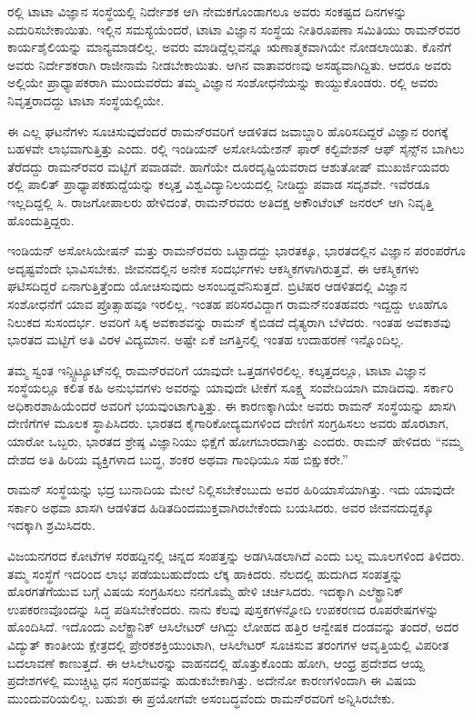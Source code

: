 ರಲ್ಲಿ ಟಾಟಾ ವಿಜ್ಞಾನ ಸಂಸ್ಥೆಯಲ್ಲಿ ನಿರ್ದೇಶಕ ಆಗಿ ನೇಮಕಗೊಂಡಾಗಲೂ ಅವರು ಸಂಕಷ್ಟದ ದಿನಗಳನ್ನು ಎದುರಿಸಬೇಕಾಯಿತು. ಇಲ್ಲಿನ ಸಮಸ್ಯೆಯೆಂದರೆ, ಟಾಟಾ ವಿಜ್ಞಾನ ಸಂಸ್ಥೆಯ ನೀತಿರೂಪಣಾ ಸಮಿತಿಯು ರಾಮನ್‍ರವರ ಕಾರ್ಯಶೈಲಿಯನ್ನು ಮಾನ್ಯಮಾಡಲಿಲ್ಲ. ಅವರು ಮಾಡಿದ್ದೆಲ್ಲವನ್ನೂ ಋಣಾತ್ಮಕವಾಗಿಯೇ ನೋಡಲಾಯಿತು. ಕೊನೆಗೆ ಅವರು ನಿರ್ದೇಶಕರಾಗಿ ರಾಜೀನಾಮೆ ನೀಡಬೇಕಾಯಿತು. ಆಗಿನ ವಾತಾವರಣವು ಅಸಹ್ಯವಾಗಿದ್ದಿತು. ಆದರೂ ಅವರು ಅಲ್ಲಿಯೇ ಪ್ರಾಧ್ಯಾಪಕರಾಗಿ ಮುಂದುವರೆದು ತಮ್ಮ ವಿಜ್ಞಾನ ಸಂಶೋಧನೆಯನ್ನು ಕಾಯ್ದುಕೊಂಡರು. ರಲ್ಲಿ ಅವರು ನಿವೃತ್ತರಾದದ್ದು ಟಾಟಾ ಸಂಸ್ಥೆಯಲ್ಲಿಯೇ.

ಈ ಎಲ್ಲ ಘಟನೆಗಳು ಸೂಚಿಸುವುದೆಂದರೆ ರಾಮನ್‍ರವರಿಗೆ ಆಡಳಿತದ ಜವಾಬ್ದಾರಿ ಹೊರಿಸದಿದ್ದರೆ ವಿಜ್ಞಾನ ರಂಗಕ್ಕೆ ಬಹಳವೇ ಲಾಭವಾಗುತ್ತಿತ್ತು ಎಂದು. ರಲ್ಲಿ ಇಂಡಿಯನ್ ಅಸೋಸಿಯೇಶನ್ ಫಾರ್ ಕಲ್ಟಿವೇಶನ್ ಆಫ್ ಸೈನ್ಸ್‌ನ ಬಾಗಿಲು ತೆರೆದದ್ದು ರಾಮನ್‍ರವರ ಮಟ್ಟಿಗೆ ಪವಾಡವೇ. ಹಾಗೆಯೇ ದೂರದೃಷ್ಟಿಯವರಾದ ಆಶುತೋಷ್ ಮುಖರ್ಜಿಯವರು ರಲ್ಲಿ ಪಾಲಿತ್ ಪ್ರಾಧ್ಯಾಪಕ\break ಹುದ್ದೆಯನ್ನು ಕಲ್ಕತ್ತ ವಿಶ್ವವಿದ್ಯಾನಿಲಯದಲ್ಲಿ ನೀಡಿದ್ದು ಪವಾಡ ಸದೃಶವೇ. ಇವೆರಡೂ ಇಲ್ಲದಿದ್ದಲ್ಲಿ ಸಿ. ರಾಜಗೋಪಾಲರು ಹೇಳಿದಂತೆ, ರಾಮನ್‍ರವರು ಅತಿದಕ್ಷ ಅಕೌಂಟೆಂಟ್ ಜನರಲ್ ಆಗಿ ನಿವೃತ್ತಿ ಹೊಂದುತ್ತಿದ್ದರು.

ಇಂಡಿಯನ್ ಅಸೋಸಿಯೇಷನ್ ಮತ್ತು ರಾಮನ್‍ರವರು ಒಟ್ಟಾದದ್ದು ಭಾರತಕ್ಕೂ, ಭಾರತದಲ್ಲಿನ ವಿಜ್ಞಾನ ಪರಂಪರೆಗೂ ಅದೃಷ್ಟವೆಂದೇ ಭಾವಿಸಬೇಕು. ಜೀವನದಲ್ಲಿನ ಅನೇಕ ಸಂದರ್ಭಗಳು ಆಕಸ್ಮಿಕಗಳಾಗಿರುತ್ತವೆ. ಈ ಆಕಸ್ಮಿಕಗಳು ಘಟಿಸದಿದ್ದರೆ ಏನಾಗುತ್ತಿತ್ತೆಂದು ಯೋಚಿಸುವುದು ಅಸಂಬದ್ದ\-ವೆನಿಸುತ್ತದೆ. ಬ್ರಿಟಿಷರ ಆಡಳಿತದಲ್ಲಿ ವಿಜ್ಞಾನ ಸಂಶೋಧನೆಗೆ ಯಾವ ಪ್ರೊತ್ಸಾಹವೂ ಇರಲಿಲ್ಲ. ಇಂತಹ ಪರಿಸರವಿದ್ದಾಗ ರಾಮನ್‌ನಂತಹವರು ಇದ್ದದ್ದು ಊಹೆಗೂ ನಿಲುಕದ ಸುಸಂದರ್ಭ. ಅವರಿಗೆ ಸಿಕ್ಕ ಅವಕಾಶವನ್ನು ರಾಮನ್ ಕೈಬಿಡದೆ ದೈತ್ಯರಾಗಿ ಬೆಳೆದರು. ಇಂತಹ ಅವಕಾಶವು ಭಾರತದ ಮಟ್ಟಿಗೆ ಅತಿ ವಿರಳ ವಿದ್ಯಮಾನ. ಅಷ್ಟೇ ಏಕೆ ಜಗತ್ತಿನಲ್ಲಿ ಇಂತಹ ಉದಾಹರಣೆ ಇನ್ನೊಂದಿಲ್ಲ.

ತಮ್ಮ ಸ್ವಂತ ಇನ್ಸ್ಟಿಟ್ಯೂಟ್‍ನಲ್ಲಿ ರಾಮನ್‍ರವರಿಗೆ ಯಾವುದೇ ಒತ್ತಡಗಳಿರಲಿಲ್ಲ. ಕಲ್ಕತ್ತದಲ್ಲೂ, ಟಾಟಾ ವಿಜ್ಞಾನ ಸಂಸ್ಥೆಯಲ್ಲೂ ಕಲಿತ ಕಹಿ ಅನುಭವಗಳು ಅವರನ್ನು ಯಾವುದೇ ಟೀಕೆಗೆ ಸೂಕ್ಷ್ಮ ಸಂವೇದಿಯಾಗಿ ಮಾಡಿದವು. ಸರ್ಕಾರಿ ಅಧಿಕಾರಶಾಹಿಯೆಂದರೆ ಅವರಿಗೆ ಭಯವುಂಟಾಗುತ್ತಿತ್ತು. ಈ ಕಾರಣಕ್ಕಾಗಿಯೇ ಅವರು ರಾಮನ್ ಸಂಸ್ಥೆಯನ್ನು ಖಾಸಗಿ ದೇಣಿಗೆಗಳ ಮೂಲಕ ಸ್ಥಾಪಿಸಿದರು. ಭಾರತದ ಕೈಗಾರಿಕೋದ್ಯಮಗಳಿಂದ ದೇಣಿಗೆ ಸಂಗ್ರಹಿಸಲು ಅವರು ಹೊರಟಾಗ, ಯಾರೋ ಒಬ್ಬರು, ಭಾರತದ ಶ್ರೇಷ್ಠ ವಿಜ್ಞಾನಿಯು ಭಿಕ್ಷೆಗೆ ಹೋಗಬಾರದಾಗಿತ್ತು ಎಂದರು. ರಾಮನ್ ಹೇಳಿದರು “ನಮ್ಮ ದೇಶದ ಅತಿ ಹಿರಿಯ ವ್ಯಕ್ತಿಗಳಾದ ಬುದ್ಧ, ಶಂಕರ ಅಥವಾ ಗಾಂಧಿಯೂ ಸಹ ಬಿಕ್ಷುಕರೇ.”

\vskip 2pt

ರಾಮನ್ ಸಂಸ್ಥೆಯನ್ನು ಭದ್ರ ಬುನಾದಿಯ ಮೇಲೆ ನಿಲ್ಲಿಸಬೇಕೆಂಬುದು ಅವರ ಹಿರಿಯಾಸೆ\-ಯಾಗಿತ್ತು. ಇದು ಯಾವುದೇ ಸರ್ಕಾರಿ ಅಥವಾ ಖಾಸಗಿ ಆಡಳಿತದ ಹಿಡಿತದಿಂದ\break ಮುಕ್ತವಾಗಿರಬೇಕೆಂದು ಬಯಸಿದರು. ಅವರ ಜೀವನದುದ್ದಕ್ಕೂ ಇದಕ್ಕಾಗಿ ಶ್ರಮಿಸಿದರು.

\vskip 2pt

ವಿಜಯನಗರದ ಕೋಟೆಗಳ ಸರಹದ್ದಿನಲ್ಲಿ ಚಿನ್ನದ ಸಂಪತ್ತನ್ನು ಅಡಗಿಸಿಡಲಾಗಿದೆ ಎಂದು ಬಲ್ಲ ಮೂಲಗಳಿಂದ ತಿಳಿದರು. ತಮ್ಮ ಸಂಸ್ಥೆಗೆ ಇದರಿಂದ ಲಾಭ ಪಡೆಯಬಹುದೆಂದು ಲೆಕ್ಕ ಹಾಕಿದರು. ನೆಲದಲ್ಲಿ ಹುದುಗಿದ ಸಂಪತ್ತನ್ನು ಹೊರಗತೆಗೆಯುವ ಬಗ್ಗೆ ವಿಷಯ ಸಂಗ್ರಹಿಸಲು ನನಗೊಮ್ಮೆ ಹೇಳಿ ಚರ್ಚಿಸಿದರು. ಇದಕ್ಕಾಗಿ ಎಲೆಕ್ಟ್ರಾನಿಕ್ ಉಪಕರಣವೊಂದನ್ನು ಸಿದ್ಧ ಪಡಿಸಬೇಕೆಂದರು. ನಾನು ಕೆಲವು ಪುಸ್ತಕಗಳನ್ನೋದಿ ಉಪಕರಣದ ರೂಪರೇಷಗಳನ್ನು ಹೊಂದಿಸಿದೆ. ಇದೊಂದು ಎಲೆಕ್ಟ್ರಾನಿಕ್ ಆಸಿಲೇಟರ್ ಆಗಿದ್ದು ಲೋಹದ ಹತ್ತಿರ ಆನ್ವೇಷಕ ದಂಡವನ್ನು ತಂದರೆ, ಅದರ ವಿದ್ಯುತ್ ಕಾಂತೀಯ ಕ್ಷೇತ್ರದಲ್ಲಿ ಪ್ರೇರಕಶಕ್ತಿಯುಂಟಾಗಿ, ಆಸಿಲೇಟರ್ ಸೂಚಿಸುವ ತರಂಗಗಳ ಆವೃತ್ತಿಯಲ್ಲಿ ವಿಪರೀತ ಬದಲಾವಣೆ ಕಾಣುತ್ತದೆ. ಈ ಆಸಿಲೇಟರನ್ನು ವಾಹನದಲ್ಲಿ ಹೊತ್ತುಕೊಂಡು ಹೋಗಿ, ಆಂಧ್ರ ಪ್ರದೇಶದ ಆಯ್ದ ಪ್ರದೇಶಗಳಲ್ಲಿ ಮುಚ್ಚಿಟ್ಟ ಧನ ಸಂಗ್ರಹವನ್ನು ಹುಡುಕಬೇಕಾಗಿತ್ತು. ಅದೇನೋ ಕಾರಣಗಳಿಂದಾಗಿ ಈ ವಿಷಯ ಮುಂದುವರಿಯಲಿಲ್ಲ. ಬಹುಶಃ ಈ ಪ್ರಯೋಗವೇ ಅಸಂಬದ್ಧವೆಂದು ರಾಮನ್‍ರವರಿಗೆ ಅನ್ನಿಸಿರಬೇಕು.

